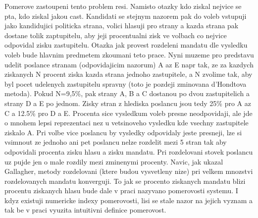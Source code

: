 \documentclass[12pt,a4paper]{report}
\begin{document}
Pomerove zastoupeni tento problem resi.
Namisto otazky kdo ziskal nejvice se pta, kdo ziskal jakou cast. Kandidati se stejnym nazorem pak do voleb vstupuji jako kandidujici politicka strana, volici hlasuji pro strany a kazda strana pak dostane tolik zaptupitelu, aby jeji procentualni zisk ve volbach co nejvice odpovidal zisku zastupitelu.
Otazka jak provest rozdeleni mandatu dle vysledku voleb bude hlavnim predmetem zkoumani teto prace.
Nyni muzeme pro predstavu udelit poslance stranam (odpovidajicim nazorum) A az E napr tak, ze za kazdych ziskanych N procent ziska kazda strana jednoho zastupitele, a N zvolime tak, aby byl pocet udelenych zastupitelu spravny (toto je pozdeji zminovana d'Hondtova metoda).
Pokud N=9,5\%, pak strany A, B a C dostanou po dvou zastupitelich a strany D a E po jednom.
Zisky stran z hlediska poslancu jsou tedy 25\% pro A az C a 12.5\% pro D a E.
Procenta sice vysledkum voleb presne neodpovidaji, ale jde o mnohem lepsi reprezentaci nez u vetsinoveho vysledku kde vsechny zastupitele ziskalo A.
Pri volbe vice poslancu by vysledky odpovidaly jeste presneji, lze si vsimnout ze jednoho ani pet poslancu nelze  rozdelit mezi 5 stran tak aby odpovidali procenta zisku hlasu a zisku mandatu.
Pri rozdelovani stovek poslancu uz pujde jen o male rozdily mezi zminenymi procenty.
Navic, jak ukazal Gallagher, metody rozdelovani (ktere budou vysvetleny nize) pri velkem mnozstvi rozdelovanych mandatu konverguji.\autocite{GAL1}
To jak se procento ziskanych mandatu  blizi procentu ziskanych hlasu bude dale v praci nazyvano pomerovosti systemu.
I kdyz existuji numericke indexy pomerovosti, lisi se stale nazor na jejich vyznam a tak be v praci vyuzita intuitivni definice pomerovost. 
\end{document}
